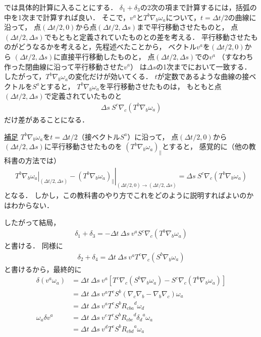 \documentclass[a4paper]{jsarticle}
\begin{document}
では具体的計算に入ることにする．
$\delta_1 + \delta_3$の2次の項まで計算するには，括弧の中を1次まで計算すれば良い．
そこで，$v^a$と$T^b \nabla_b \omega_a$について，$t=\Delta t/2$の曲線に沿って，
点$(\Delta t/2, 0)$から点$(\Delta t/2, \Delta s)$まで平行移動させたものと，
点$(\Delta t/2, \Delta s)$でもともと定義されていたものとの差を考える．
平行移動させたものがどうなるかを考えると，先程述べたことから，
ベクトル$v^a$を$(\Delta t/2, 0)$から
$(\Delta t/2, \Delta s)$に直接平行移動したものと，
点$(\Delta t/2, \Delta s)$での$v^a$
（すなわち作った閉曲線に沿って平行移動させた$v^a$）
は$\Delta s$の1次までにおいて一致する．
したがって，$T^b \nabla_b \omega_a$の変化だけが効いてくる．
$t$が定数であるような曲線の接ベクトルを$S^a$とすると，
$T^b \nabla_b \omega_a$を平行移動させたものは，
もともと点$(\Delta t/2, \Delta s)$で定義されていたものと
\begin{align}
	\Delta s \ S^c \nabla_c \left( T^b \nabla_b \omega_a \right)
\end{align}
だけ差があることになる．
\begin{itembox}[l]{\underline{補足}}
	$T^b \nabla_b \omega_a$を$t=\Delta t/2$（接ベクトル$S^a$）に沿って，
	点$(\Delta t/2, 0)$から$(\Delta t/2, \Delta s)$に平行移動させたものを
	$\left( T^b \nabla_b \omega_a \right)_{\parallel}$とすると，
	感覚的に（他の教科書の方法では）
	\begin{align}
		\left. T^b \nabla_b \omega_a \right|_{(\Delta t/2, \Delta s)}
		- \left. \left( T^b \nabla_b \omega_a  \right)_{\parallel}
		\right|_{(\Delta t/2, 0) \rightarrow (\Delta t/2, \Delta s)}
		= \Delta s \ S^c \nabla_c \left( T^b \nabla_b \omega_a \right)
	\end{align}
	となる．
	しかし，この教科書のやり方でこれをどのように説明すればよいのかはわからない．
\end{itembox}
したがって結局，
\begin{align}
	\delta_1 + \delta_3 = -\Delta t \ \Delta s \ v^a S^c \nabla_c
	\left( T^b \nabla_b \omega_a \right)
\end{align}
と書ける．
同様に
\begin{align}
	\delta_2 + \delta_4 = \Delta t \ \Delta s \ v^a T^c \nabla_c
	\left( S^b \nabla_b \omega_a \right)
\end{align}
と書けるから，最終的に
\begin{align}
	\delta \left( v^a \omega_a \right) &= \Delta t \ \Delta s \ v^a \left[
		T^c \nabla_c \left( S^b \nabla_b \omega_a \right)
		- S^c \nabla_c \left( T^b \nabla_b \omega_a \right)
	\right] \\
	&= \Delta t \ \Delta s \ v^a T^c S^b \left(
		\nabla_c \nabla_b - \nabla_b \nabla_c
	\right) \omega_a \\
	&= \Delta t \ \Delta s \ v^a T^c S^b {R_{cba}}^d \omega_d \\
	\omega_a \delta v^a &=
	\Delta t \ \Delta s \ v^e T^c S^b {R_{cbe}}^d {\delta_d}^a \omega_a \\
	&= \Delta t \ \Delta s \ v^d T^c S^b {R_{cbd}}^a \omega_a
\end{align}
\end{document}
